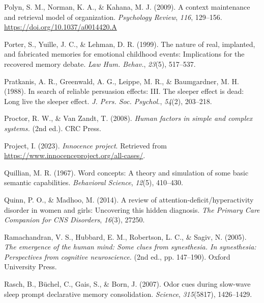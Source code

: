 \documentclass[
]{krantz}
\newlength{\cslhangindent}
\newlength{\cslentryspacingunit} %
\newenvironment{CSLReferences}[2] %
 {%
  \setlength{\parindent}{0pt}
  \ifodd #1
  \let\oldpar\par
  \def\par{\hangindent=\cslhangindent\oldpar}
  \fi
  \setlength{\parskip}{#2\cslentryspacingunit}
 }%
 {}
\begin{document}
\begin{CSLReferences}{1}{0}
\leavevmode{}%
Polyn, S. M., Norman, K. A., \& Kahana, M. J. (2009). A context maintenance and retrieval model of organization. \emph{Psychology Review}, \emph{116}, 129--156. \url{https://doi.org/10.1037/a0014420.A}

\leavevmode{}%
Porter, S., Yuille, J. C., \& Lehman, D. R. (1999). The nature of real, implanted, and fabricated memories for emotional childhood events: Implications for the recovered memory debate. \emph{Law Hum. Behav.}, \emph{23}(5), 517--537.

\leavevmode{}%
Pratkanis, A. R., Greenwald, A. G., Leippe, M. R., \& Baumgardner, M. H. (1988). In search of reliable persuasion effects: {III}. The sleeper effect is dead: Long live the sleeper effect. \emph{J. Pers. Soc. Psychol.}, \emph{54}(2), 203--218.

\leavevmode{}%
Proctor, R. W., \& Van Zandt, T. (2008). \emph{Human factors in simple and complex systems.} (2nd ed.). CRC Press.

\leavevmode{}%
Project, I. (2023). \emph{Innocence project}. Retrieved from \url{https://www.innocenceproject.org/all-cases/}.

\leavevmode{}%
Quillian, M. R. (1967). Word concepts: A theory and simulation of some basic semantic capabilities. \emph{Behavioral Science}, \emph{12}(5), 410--430.

\leavevmode{}%
Quinn, P. O., \& Madhoo, M. (2014). A review of attention-deficit/hyperactivity disorder in women and girls: Uncovering this hidden diagnosis. \emph{The Primary Care Companion for CNS Disorders}, \emph{16}(3), 27250.

\leavevmode{}%
Ramachandran, V. S., Hubbard, E. M., Robertson, L. C., \& Sagiv, N. (2005). \emph{The emergence of the human mind: Some clues from synesthesia. In synesthesia: Perspectives from cognitive neuroscience.} (2nd ed., pp. 147--190). Oxford University Press.

\leavevmode{}%
Rasch, B., Büchel, C., Gais, S., \& Born, J. (2007). Odor cues during slow-wave sleep prompt declarative memory consolidation. \emph{Science}, \emph{315}(5817), 1426--1429.


\end{CSLReferences}
\end{document}

